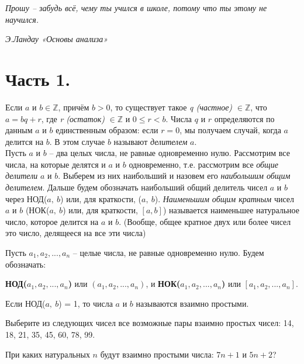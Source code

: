 
\epigraph{\textit{Прошу -- забудь всё, чему ты учился в школе, потому что ты этому не научился.}}{\textit{Э.Ландау «Основы анализа»}}

\section{Часть 1.}

Если $a$ и $b \in \mathbb{Z}$, причём $b > 0$, то существует такое \textit{q (частное)} $\in \mathbb{Z}$, что $a = bq + r$, где \textit{r (остаток)} $\in \mathbb{Z}$ и $0 \leq r < b$. Числа $q$ и $r$ определяются по данным $a$ и $b$ единственным образом: если $r = 0$, мы получаем случай, когда $a$ делится на $b$. В этом случае $b$ называют \textit{делителем} $a$.
\\ Пусть $a$ и $b$ -- два целых числа, не равные одновременно нулю. Рассмотрим все числа, на которые делятся и $a$ и $b$ одновременно, т.е. рассмотрим все \textit{общие делители} $a$ и $b$. Выберем из них наибольший и назовем его \textit{наибольшим общим делителем}. Дальше будем обозначать наибольший общий делитель чисел $a$ и $b$ через НОД($a,~b$) или, для краткости, ($a,~b$). \textit{Наименьшим общим кратным} чисел $a$ и $b$ (НОК($a,~b$) или, для краткости, $[a, b]$) называется наименьшее натуральное число, которое делится на $a$ и $b$. (Вообще, общее кратное двух
или более чисел это число, делящееся на все эти числа)
\par
Пусть $a_1, a_2, ... , a_n$ -- целые числа, не равные одновременно нулю. Будем обозначать:
\begin{center}
    \textbf{НОД($a_1, a_2, ... , a_n$)} или $(a_1, a_2, ... , a_n)$, и \textbf{НОК($a_1, a_2, ... , a_n$)} или $[a_1, a_2, ... , a_n]$.
\end{center}

\begin{dfn}
    Если НОД($a,~b$) = 1, то числа $a$ и $b$ называются взаимно простыми.
\end{dfn}

\begin{ex} \label {10.7 ex1}
    Выберите из следующих чисел все возможные пары взаимно простых чисел: 14, 18, 21, 35, 45, 60, 78, 99.
\end{ex}

\begin{thm}
    При каких натуральных $n$ будут взаимно простыми числа: $7n + 1$ и $5n + 2$?
\end{thm}

